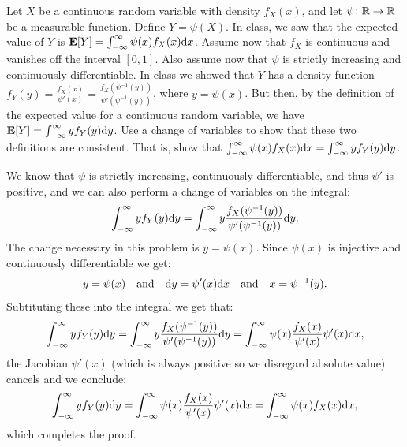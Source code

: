 \documentclass[11pt,a4paper]{article}
\begin{document}
\begin{exercise}
  Let $X$ be a continuous random variable with density $f_X(x)$,
  and let $\psi \colon \mathbb{R} \to \mathbb{R}$ be a measurable function.
  Define $Y = \psi(X)$.
  In class, we saw that the expected value of $Y$ is
  $\E[Y] = \int_{-\infty}^{\infty} \psi(x) f_X(x) \dx$.
  Assume now that $f_X$ is continuous and vanishes off the interval $[0,1]$.
  Also assume now that $\psi$ is strictly increasing and continuously
  differentiable.
  In class we showed that $Y$ has a density function
  $f_Y(y) = \frac{f_X(x)}{\psi'(x)} = \frac{f_X(\psi^{-1}(y))}{\psi'(\psi^{-1}(y))}$,
  where $y = \psi(x)$.
  But then, by the definition of the expected value for a continuous
  random variable, we have $\E[Y] = \int_{-\infty}^{\infty} y f_Y(y) \dy$.
  Use a change of variables to show that these two definitions are consistent.
  That is, show that
  $\int_{-\infty}^{\infty} \psi(x) f_X(x) \dx = \int_{-\infty}^{\infty} y f_Y(y) \dy$.
\end{exercise}
\begin{solution}
  We know that $\psi$ is strictly increasing, continuously differentiable,
  and thus $\psi'$ is positive, and we can also perform a change of variables
  on the integral:
  \[
    \int_{-\infty}^{\infty} y f_Y(y) \dy =
    \int_{-\infty}^{\infty} y \frac{f_X(\psi^{-1}(y))}{\psi'(\psi^{-1}(y))} \dy.
  \]
  The change necessary in this problem is $y = \psi(x)$.
  Since $\psi(x)$ is injective and continuously differentiable we get:
  \[
    y = \psi(x) \tand
    \dy = \psi'(x) \dx \tand
    x = \psi^{-1}(y).
  \]
  Subtituting these into the integral we get that:
  \[
    \int_{-\infty}^{\infty} y f_Y(y) \dy =
    \int_{-\infty}^{\infty} y \frac{f_X(\psi^{-1}(y))}{\psi'(\psi^{-1}(y))} \dy =
    \int_{-\infty}^{\infty} \psi(x) \frac{f_X(x)}{\psi'(x)} \psi'(x) \dx,
  \]
  the Jacobian $\psi'(x)$ (which is always positive so we disregard absolute
  value) cancels and we conclude:
  \[
    \int_{-\infty}^{\infty} y f_Y(y) \dy =
    \int_{-\infty}^{\infty} \psi(x) \frac{f_X(x)}{\psi'(x)} \psi'(x) \dx =
    \int_{-\infty}^{\infty} \psi(x) f_X(x) \dx,
  \]
  which completes the proof.
\end{solution}
\end{document}
